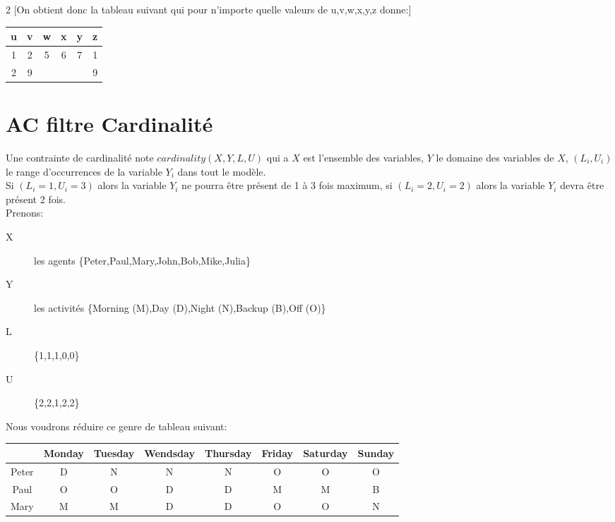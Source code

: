\begin{multicols}{2}
[On obtient donc la tableau suivant qui pour n'importe quelle valeurs de u,v,w,x,y,z donne:]
\begin{tabular}{cccccc}
u&v&w&x&y&z\\ \hline 1&2&5&6&7&1\\ 2&9&$ $&$ $&$ $&9\\
\end{tabular}
\end{multicols}
\pagebreak
\section{AC filtre Cardinalité}

Une contrainte de cardinalité note $cardinality(X,Y,L,U)$ qui a $X$ est l'ensemble des variables, $Y$ le domaine des variables de $X$, $(L_i,U_i)$ le range d'occurrences de la variable $Y_i$ dans tout le modèle.\\
Si $(L_i=1,U_i=3)$ alors la variable $Y_i$ ne pourra être présent de 1 à 3 fois maximum, si $(L_i=2,U_i=2)$ alors la variable $Y_i$ devra être présent 2 fois.\\

Prenons:
\begin{description}
\item[X] les agents \{Peter,Paul,Mary,John,Bob,Mike,Julia\}
\item[Y] les activités \{Morning (M),Day (D),Night (N),Backup (B),Off (O)\}
\item[L] \{1,1,1,0,0\}
\item[U] \{2,2,1,2,2\}
\end{description}

Nous voudrons réduire ce genre de tableau suivant:\\
\begin{tabular}{c|ccccccc}
$ $&Monday&Tuesday&Wendsday&Thursday&Friday&Saturday&Sunday\\ \hline
Peter&D&N&N&N&O&O&O\\
Paul&O&O&D&D&M&M&B\\
Mary&M&M&D&D&O&O&N\\
\end{tabular}

